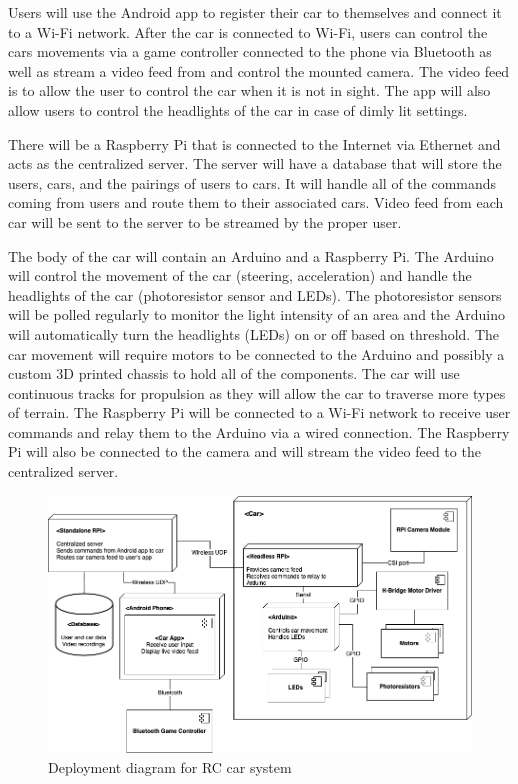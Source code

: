 \documentclass[letterpaper,12pt]{report}
\begin{document}
    Users will use the Android app to register their car to themselves and
    connect it to a Wi-Fi network. After the car is connected to Wi-Fi,
    users can control the cars movements via a game controller connected to
    the phone via Bluetooth as well as stream a video feed from and control
    the mounted camera. The video feed is to allow the user to control the
    car when it is not in sight. The app will also allow users to control
    the headlights of the car in case of dimly lit settings.

    There will be a Raspberry Pi that is connected to the Internet via
    Ethernet and acts as the centralized server. The server will have a
    database that will store the users, cars, and the pairings of users to
    cars. It will handle all of the commands coming from users and route
    them to their associated cars. Video feed from each car will be sent to
    the server to be streamed by the proper user.

    The body of the car will contain an Arduino and a Raspberry Pi. The
    Arduino will control the movement of the car (steering, acceleration)
    and handle the headlights of the car (photoresistor sensor and LEDs).
    The photoresistor sensors will be polled regularly to monitor the light
    intensity of an area and the Arduino will automatically turn the
    headlights (LEDs) on or off based on threshold. The car movement will
    require motors to be connected to the Arduino and possibly a custom 3D
    printed chassis to hold all of the components. The car will use
    continuous tracks for propulsion as they will allow the car to traverse
    more types of terrain. The Raspberry Pi will be connected to a Wi-Fi
    network to receive user commands and relay them to the Arduino via a
    wired connection. The Raspberry Pi will also be connected to the camera
    and will stream the video feed to the centralized server.

    \begin{figure}[H]
        \centering
        \includegraphics[width=0.9\linewidth]{diagrams/Design_Deployment_Diagram.png}
        \caption{Deployment diagram for RC car system}
        \label{fig:deployment}
    \end{figure}
\end{document}
